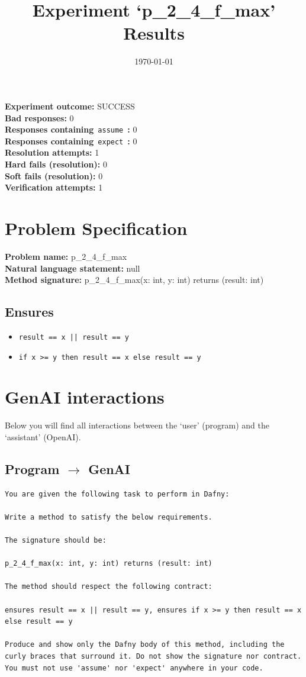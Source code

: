\documentclass{article}
\begin{document}
\title{Experiment `p\_2\_4\_f\_max' Results}
\author{\today}
\date{}
\maketitle
\textbf{Experiment outcome: }SUCCESS
\\\textbf{Bad responses: }0
\\\textbf{Responses containing}~\texttt{assume}~\textbf{: }0
\\\textbf{Responses containing}~\texttt{expect}~\textbf{: }0
\\\textbf{Resolution attempts: }1
\\\textbf{Hard fails (resolution): }0
\\\textbf{Soft fails (resolution): }0
\\\textbf{Verification attempts: }1
\section*{Problem Specification}
\textbf{Problem name: }p\_2\_4\_f\_max
\\\textbf{Natural language statement: }null
\\\textbf{Method signature: }p\_2\_4\_f\_max(x: int, y: int) returns (result: int)
\subsection*{Ensures}
\begin{itemize}
\item \texttt{result == x || result == y}
\item \texttt{if x >= y then result == x else result == y}
\end{itemize}
\clearpage
\section*{GenAI interactions}
Below you will find all interactions between the `user' (program) and the `assistant' (OpenAI).
\subsection*{Program $\rightarrow$ GenAI}
\begin{lstlisting}
You are given the following task to perform in Dafny:

Write a method to satisfy the below requirements.

The signature should be:

p_2_4_f_max(x: int, y: int) returns (result: int)

The method should respect the following contract:

ensures result == x || result == y, ensures if x >= y then result == x else result == y

Produce and show only the Dafny body of this method, including the curly braces that surround it. Do not show the signature nor contract. You must not use 'assume' nor 'expect' anywhere in your code.
\end{lstlisting}
\end{document}
